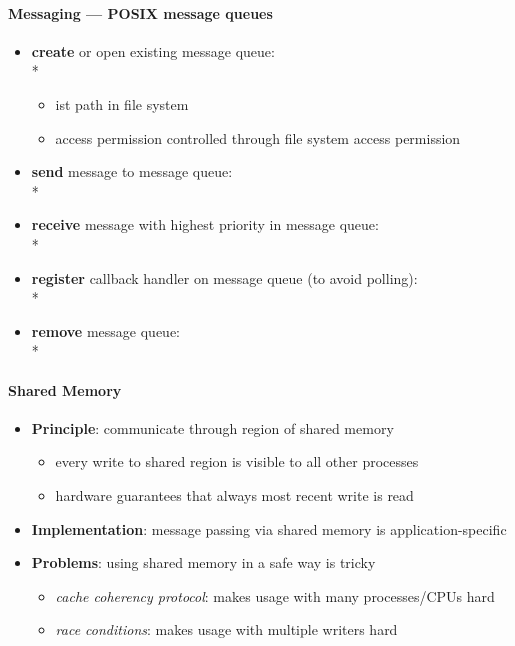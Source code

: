 \paragraph{Messaging --- POSIX message queues}
\begin{itemize}
  \item \textbf{create} or open existing message queue: \\*
    \begin{itemize}
      \item {} ist path in file system
      \item access permission controlled through file system access permission
    \end{itemize}
  \item \textbf{send} message to message queue: \\*
  \item \textbf{receive} message with highest priority in message queue: \\*
  \item \textbf{register} callback handler on message queue (to avoid polling): \\*
  \item \textbf{remove} message queue: \\*
\end{itemize}

\paragraph{Shared Memory}
\begin{itemize}
  \item \textbf{Principle}: communicate through region of shared memory
  \begin{itemize}
    \item every write to shared region is visible to all other processes
    \item hardware guarantees that always most recent write is read
  \end{itemize}
  \item \textbf{Implementation}: message passing via shared memory is application-specific
  \item \textbf{Problems}: using shared memory in a safe way is tricky
  \begin{itemize}
    \item \emph{cache coherency protocol}: makes usage with many processes/CPUs hard
    \item \emph{race conditions}: makes usage with multiple writers hard
  \end{itemize}
\end{itemize}

